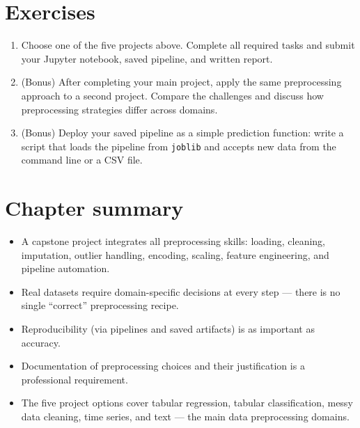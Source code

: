 \section{Exercises}

\begin{exercise}
\begin{enumerate}
  \item Choose one of the five projects above. Complete all required tasks and submit your Jupyter notebook, saved pipeline, and written report.
  \item (Bonus) After completing your main project, apply the same preprocessing approach to a second project. Compare the challenges and discuss how preprocessing strategies differ across domains.
  \item (Bonus) Deploy your saved pipeline as a simple prediction function: write a script that loads the pipeline from \texttt{joblib} and accepts new data from the command line or a CSV file.
\end{enumerate}
\end{exercise}

\section{Chapter summary}

\begin{itemize}
  \item A capstone project integrates all preprocessing skills: loading, cleaning, imputation, outlier handling, encoding, scaling, feature engineering, and pipeline automation.
  \item Real datasets require domain-specific decisions at every step --- there is no single ``correct'' preprocessing recipe.
  \item Reproducibility (via pipelines and saved artifacts) is as important as accuracy.
  \item Documentation of preprocessing choices and their justification is a professional requirement.
  \item The five project options cover tabular regression, tabular classification, messy data cleaning, time series, and text --- the main data preprocessing domains.
\end{itemize}
